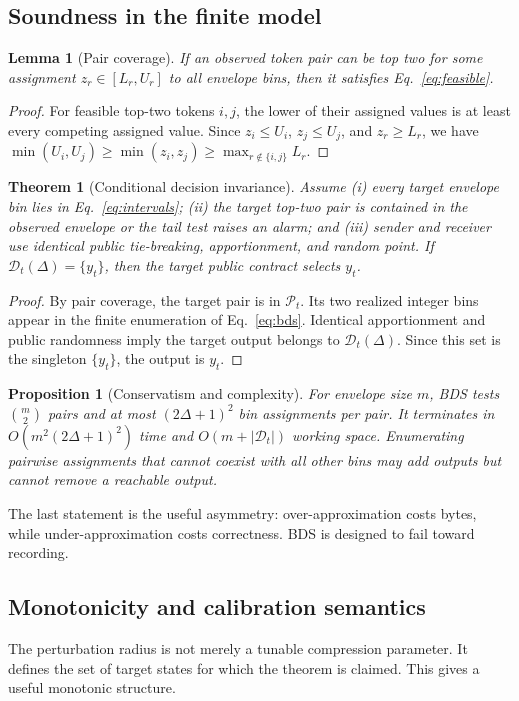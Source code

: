 \documentclass[sigconf,review,nonacm]{acmart}
\newtheorem{theorem}{Theorem}
\newtheorem{lemma}{Lemma}
\newtheorem{proposition}{Proposition}
\newcommand{\DecisionSet}{\mathcal{D}}
\newcommand{\FeasiblePairs}{\mathcal{P}}
\begin{document}
\subsection{Soundness in the finite model}
\begin{lemma}[Pair coverage]
If an observed token pair can be top two for some assignment $z_r\in[L_r,U_r]$ to all envelope bins, then it satisfies Eq.~\eqref{eq:feasible}.
\end{lemma}
\begin{proof}
For feasible top-two tokens $i,j$, the lower of their assigned values is at least every competing assigned value. Since $z_i\le U_i$, $z_j\le U_j$, and $z_r\ge L_r$, we have $\min(U_i,U_j)\ge\min(z_i,z_j)\ge\max_{r\notin\{i,j\}}L_r$.
\end{proof}

\begin{theorem}[Conditional decision invariance]
Assume (i) every target envelope bin lies in Eq.~\eqref{eq:intervals}; (ii) the target top-two pair is contained in the observed envelope or the tail test raises an alarm; and (iii) sender and receiver use identical public tie-breaking, apportionment, and random point. If $\DecisionSet_t(\Delta)=\{y_t\}$, then the target public contract selects $y_t$.
\end{theorem}
\begin{proof}
By pair coverage, the target pair is in $\FeasiblePairs_t$. Its two realized integer bins appear in the finite enumeration of Eq.~\eqref{eq:bds}. Identical apportionment and public randomness imply the target output belongs to $\DecisionSet_t(\Delta)$. Since this set is the singleton $\{y_t\}$, the output is $y_t$.
\end{proof}

\begin{proposition}[Conservatism and complexity]
For envelope size $m$, BDS tests $\binom{m}{2}$ pairs and at most $(2\Delta+1)^2$ bin assignments per pair. It terminates in $O(m^2(2\Delta+1)^2)$ time and $O(m+|\DecisionSet_t|)$ working space. Enumerating pairwise assignments that cannot coexist with all other bins may add outputs but cannot remove a reachable output.
\end{proposition}

The last statement is the useful asymmetry: over-approximation costs bytes, while under-approximation costs correctness. BDS is designed to fail toward recording.

\subsection{Monotonicity and calibration semantics}
The perturbation radius is not merely a tunable compression parameter. It defines the set of target states for which the theorem is claimed. This gives a useful monotonic structure.
\end{document}
